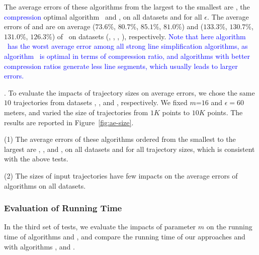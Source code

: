{The average errors of these algorithms from the largest to the smallest are \cista, the \textcolor{blue}{compression} optimal algorithm \osed~and \cist, on all datasets and for all $\epsilon$.
The average errors of \cist and \cista are on average
($73.6\%$, $80.7\%$, $85.1\%$, $81.0\%$)
and ($133.3\%$, $130.7\%$, $131.0\%$, $126.3\%$)
of \osed~on datasets (\sercar, \geolife, \mopsi, \pricar), respectively.
\textcolor{blue}{Note that here algorithm \osed~has the worst average error among all strong line simplification algorithms, as algorithm \osed~is optimal in terms of compression ratio, and algorithms with better compression ratios generate less line segments, which usually leads to larger errors.}

.
To evaluate the impacts of trajectory sizes on average errors, we chose the same
{$10$} trajectories from  datasets \sercar, \geolife, \mopsi and \pricar, respectively.
We fixed {$m$=$16$} and $\epsilon = 60$ meters, and varied the size  of trajectories from $1K$ points to $10K$ points.
%
The results are reported in Figure~\ref{fig:ae-size}.

\ni(1) The average errors of these algorithms ordered from the smallest to the largest are \squishe, \dps, \cist and \cista, on all datasets and for all trajectory sizes, which is consistent with the above tests.

\ni(2) The sizes of input trajectories have few impacts on the average errors of \lsa algorithms on all datasets.



	





\subsubsection{Evaluation of Running Time}

In the third set of tests, we evaluate the impacts of parameter $m$ on the running time of algorithms \cist and \cista, and compare the running time of our approaches \cist and \cista with algorithms \osed, \dps and \squishe.

}

